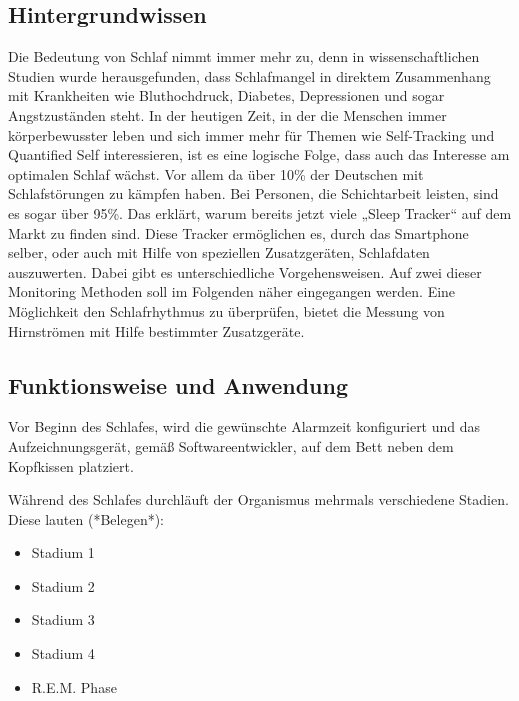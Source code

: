 \subsection{Hintergrundwissen}
\label{ch:Apps:sec:Sleepcycle:subsec:H}

Die Bedeutung von Schlaf nimmt immer mehr zu, denn in wissenschaftlichen Studien wurde herausgefunden, dass Schlafmangel in direktem Zusammenhang mit Krankheiten wie Bluthochdruck, Diabetes, Depressionen und sogar Angstzuständen steht.
In der heutigen Zeit, in der die Menschen immer körperbewusster leben und sich immer mehr für Themen wie  Self-Tracking und Quantified Self  interessieren, ist es eine logische Folge, dass auch das Interesse am optimalen Schlaf  wächst.
Vor allem da über 10\% der Deutschen mit Schlafstörungen zu kämpfen haben. Bei Personen, die Schichtarbeit leisten, sind es sogar über 95\%.
Das erklärt, warum bereits jetzt viele „Sleep Tracker“  auf dem Markt zu finden sind.
Diese Tracker ermöglichen es, durch das Smartphone selber, oder auch mit Hilfe von speziellen Zusatzgeräten, Schlafdaten auszuwerten.
Dabei gibt es unterschiedliche Vorgehensweisen.
Auf zwei dieser Monitoring Methoden soll im Folgenden näher eingegangen werden.
Eine Möglichkeit den Schlafrhythmus zu überprüfen, bietet die Messung von Hirnströmen mit Hilfe bestimmter Zusatzgeräte.


\subsection{Funktionsweise und Anwendung}
\label{ch:Apps:sec:Sleepcycle:subsec:FuA}

Vor Beginn des Schlafes, wird die gewünschte Alarmzeit konfiguriert und das Aufzeichnungsgerät, gemäß Softwareentwickler, auf dem Bett neben dem Kopfkissen platziert. 

Während des Schlafes durchläuft der Organismus mehrmals verschiedene Stadien. Diese lauten (*Belegen*):

\begin{itemize}
	\item Stadium 1
	\item Stadium 2
	\item Stadium 3
	\item Stadium 4
	\item R.E.M. Phase
\end{itemize}


